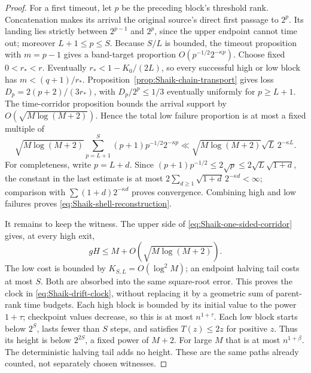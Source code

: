 \begin{proof}
For a first timeout, let \(p\) be the preceding block's threshold rank.
Concatenation makes its arrival the original source's direct first
passage to \(2^p\). Its landing lies strictly between \(2^{p-1}\) and
\(2^p\), since the upper endpoint cannot time out; moreover
\(L+1\le p\le S\). Because \(S/L\) is bounded, the timeout proposition
with \(m=p-1\) gives a band-target proportion
\(O(p^{-1/2}2^{-\kappa p})\).
Choose fixed \(0<r_*<r\). Eventually \(r_*<1-K_0/(2L)\), so every
successful high or low block has \(m<(q+1)/r_*\).
Proposition~\ref{prop:Shaik-chain-transport} gives loss
\(D_p=2(p+2)/(3r_*)\), with \(D_p/2^p\le1/3\) eventually uniformly
for \(p\ge L+1\). The time-corridor proposition bounds the arrival
support by \(O(\sqrt{M\log(M+2)})\). Hence the total low failure
proportion is at most a fixed multiple of
\[
 \sqrt{M\log(M+2)}
 \sum_{p=L+1}^{S}(p+1)p^{-1/2}2^{-\kappa p}
 \ll \sqrt{M\log(M+2)}\sqrt L\,2^{-\kappa L}.
\]
For completeness, write \(p=L+d\). Since
\((p+1)p^{-1/2}\le2\sqrt p\le2\sqrt L\sqrt{1+d}\),
the constant in the last estimate is at most
\(2\sum_{d\ge1}\sqrt{1+d}\,2^{-\kappa d}<\infty\);
comparison with \(\sum(1+d)2^{-\kappa d}\) proves convergence.
Combining high and low failures proves
\eqref{eq:Shaik-shell-reconstruction}.

It remains to keep the witness. The upper side of
\eqref{eq:Shaik-one-sided-corridor} gives, at every high exit,
\[
 gH\le M+O(\sqrt{M\log(M+2)}).
\]
The low cost is bounded by \(K_{S,L}=O(\log^2 M)\); an endpoint
halving tail costs at most \(S\). Both are absorbed into the same
square-root error. This proves the clock in
\eqref{eq:Shaik-drift-clock}, without replacing it by a geometric
sum of parent-rank time budgets.
Each high block is bounded by its initial value to the power \(1+\tau\);
checkpoint values decrease, so this is at most \(n^{1+\tau}\).
Each low block starts below \(2^S\), lasts fewer than \(S\) steps,
and satisfies \(T(z)\le2z\) for positive \(z\).
Thus its height is below \(2^{2S}\), a fixed power of \(M+2\).
For large \(M\) that is at most \(n^{1+\beta}\).
The deterministic halving tail adds no height. These are the same
paths already counted, not separately chosen witnesses.
\end{proof}

